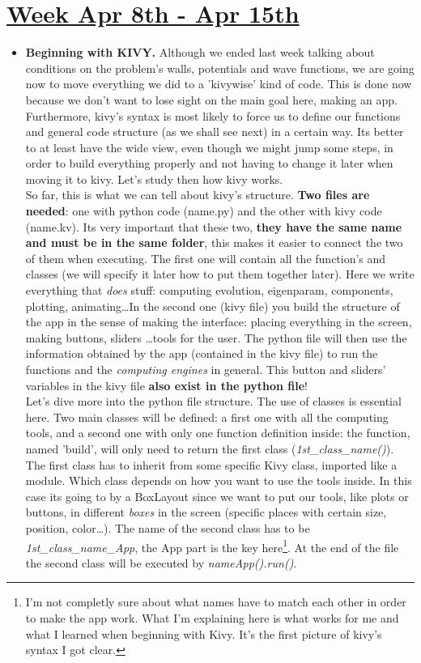 \documentclass{article}
\begin{document}
\section*{\underline{Week Apr 8th - Apr 15th}}
\begin{itemize}
	\item \textbf{Beginning with KIVY.} Although we ended last week talking about conditions on the problem's walls, potentials and wave functions, we are going now to move everything we did to a 'kivywise' kind of code. This is done now because we don't want to lose sight on the main goal here, making an app. Furthermore,  kivy's syntax is most likely to force us to define our functions and general code structure (as we shall see next) in a certain way. Its better to at least have the wide view, even though we might jump some steps, in order to build everything properly and not having to change it later when moving it to kivy. Let's study then how kivy works. \\
	So far, this is what we can tell about kivy's structure. \textbf{Two files are needed}: one with python code (name.py) and the other with kivy code (name.kv). Its very important that these two, \textbf{they have the same name and must be in the same folder}, this makes it easier to connect the two of them when executing. The first one will contain all the function's and classes (we will specify it later how to put them together later). Here we write everything that \textit{does} stuff: computing evolution, eigenparam, components, plotting, animating\dots In the second one (kivy file) you build the structure of the app in the sense of making the interface: placing everything in the screen, making buttons, sliders \dots tools for the user. The python file will then use the information obtained by the app (contained in the kivy file) to run the functions and the \textit{computing engines} in general. This button and sliders' variables in the kivy file \textbf{also exist in the python file}! \\
	Let's dive more into the python file structure. The use of classes is essential here. Two main classes will be defined: a first one with all the computing tools, and a second one with only one function definition inside: the function, named 'build', will only need to return the first class (\textit{1st\_class\_name()}). The first class has to inherit from some specific Kivy class, imported like a module. Which class depends on how you want to use the tools inside. In this case its going to by a BoxLayout since we want to put our tools, like plots or buttons, in different \textit{boxes} in the screen (specific places with certain  size, position, color\dots). The name of the second class has to be \textit{1st\_class\_name\_App}, the App part is the key here\footnote{I'm not completly sure about what names have to match each other in order to make the app work. What I'm explaining here is what works for me and what I learned when beginning with Kivy. It's the first picture of kivy's syntax I got clear.}. At the end of the file the second class will be executed by \textit{nameApp().run()}. \\

\end{itemize}
\end{document}
